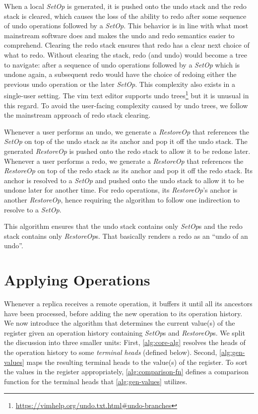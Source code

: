 \documentclass[sigplan,10pt]{acmart}
\newcommand{\setopkind}{\textit{SetOp}}
\newcommand{\restopkind}{\textit{RestoreOp}}
\begin{document}
When a local \setopkind{} is generated, it is pushed onto the undo stack and
the redo stack is cleared, which causes the loss of the ability to redo after
some sequence of undo operations followed by a \setopkind{}.
This behavior is in line with what most mainstream software does and makes the
undo and redo semantics easier to comprehend.
Clearing the redo stack ensures that redo has a clear next choice of what to redo.
Without clearing the stack, redo (and undo) would become a tree to navigate:
after a sequence of undo operations followed by a \setopkind{}
which is undone again, a subsequent redo would have the choice of redoing
either the previous undo operation or the later \setopkind{}.
This complexity also exists in a single-user setting.
The vim text editor supports undo trees\footnote{
  \url{https://vimhelp.org/undo.txt.html\#undo-branches}
} but it is unusual in this regard.
To avoid the user-facing complexity caused by undo trees,
we follow the mainstream approach of redo stack clearing.

Whenever a user performs an undo, we generate a \restopkind{} that
references the \setopkind{} on top of the undo stack as its anchor
and pop it off the undo stack.
The generated \restopkind{} is pushed onto the redo stack to allow it to be
redone later.
Whenever a user performs a redo, we generate a \restopkind{} that
references the \restopkind{} on top of the redo stack as its anchor and pop
it off the redo stack.
Its anchor is resolved to a \setopkind{} and
pushed onto the undo stack to allow it to be undone later for another time.
For redo operations, its \restopkind{}'s anchor is another \restopkind{},
hence requiring the algorithm to follow one indirection to resolve to a \setopkind{}.

This algorithm ensures that the undo stack contains only \setopkind{}s and
the redo stack contains only \restopkind{}s.
That basically renders a redo as an ``undo of an undo''.

\section{Applying Operations}\label{sec:implementation}

Whenever a replica receives a remote operation,
it buffers it until all its ancestors have been processed,
before adding the new operation to its operation history.
We now introduce the algorithm that determines the current value(s) of the
register given an operation history containing \setopkind{}s and \restopkind{}s.
We split the discussion into three smaller units:
First, \autoref{alg:core-alg} resolves the heads of the operation
history to some \emph{terminal heads} (defined below).
Second, \autoref{alg:gen-values} maps the resulting terminal
heads to the value(s) of the register.
To sort the values in the register appropriately, \autoref{alg:comparison-fn}
defines a comparison function for the terminal heads that \autoref{alg:gen-values}
utilizes.
\end{document}
